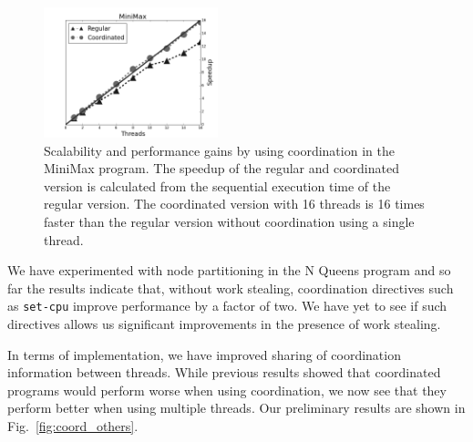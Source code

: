 \documentclass[10pt]{article}
\begin{document}
\begin{figure}[ht]
  \begin{center}
   \includegraphics[width=0.45\textwidth]{figures/coord_min-max-tictactoe}
\end{center}
\caption{Scalability and performance gains by using coordination in the MiniMax
   program. The speedup of the regular and coordinated version is calculated
   from the sequential execution time of the regular version. The coordinated
   version with 16 threads is 16 times faster than the regular version without
   coordination using a single thread.}
\label{fig:coord}
\end{figure}

We have experimented with node partitioning in the N Queens program and
so far the results indicate that, without work stealing, coordination directives
such as \texttt{set-cpu} improve performance by a factor of two. We have
yet to see if such directives allows us significant improvements in the presence
of work stealing.

In terms of implementation, we have improved sharing of coordination
information between threads. While previous results showed that
coordinated programs would perform worse when using coordination, we now see
that they perform better when using multiple threads. Our preliminary
results are shown in Fig.~\ref{fig:coord_others}.
\end{document}
